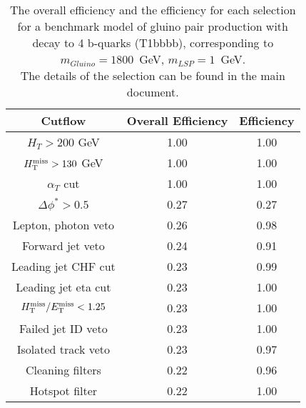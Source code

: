 \begin{longtable}{| c | c | c  | }
\caption{The overall efficiency and the efficiency for each selection for a benchmark model 
  of gluino pair production with decay to 4 b-quarks
  (T1bbbb), corresponding to $m_{Gluino} = 1800 $~GeV, $m_{LSP} = 1$~GeV. \\
  The details of the selection can be found in the main document. \label{tab:T1bbbb_1800_1}} \\    \hline 
\textbf{Cutflow} & \textbf{Overall Efficiency} & \textbf{Efficiency}\\ \hline 
$H_{T} > 200$ GeV & 1.00 & 1.00\\ \hline 
$H_{\rm T}^{\rm miss} > 130$ GeV & 1.00 & 1.00\\ \hline 
$\alpha_{T}$ cut & 1.00 & 1.00\\ \hline 
$\Delta\phi^{*} > 0.5$ & 0.27 & 0.27\\ \hline 
Lepton, photon veto & 0.26 & 0.98\\ \hline 
Forward jet veto & 0.24 & 0.91\\ \hline 
Leading jet CHF cut & 0.23 & 0.99\\ \hline 
Leading jet eta cut & 0.23 & 1.00\\ \hline 
$H_{\rm T}^{\rm miss} / E_{\rm T}^{\rm miss} < 1.25$ & 0.23 & 1.00\\ \hline 
Failed jet ID veto & 0.23 & 1.00\\ \hline 
Isolated track veto & 0.23 & 0.97\\ \hline 
Cleaning filters & 0.22 & 0.96\\ \hline 
Hotspot filter & 0.22 & 1.00\\ \hline 
    \hline 
    \hline 
\end{longtable}
